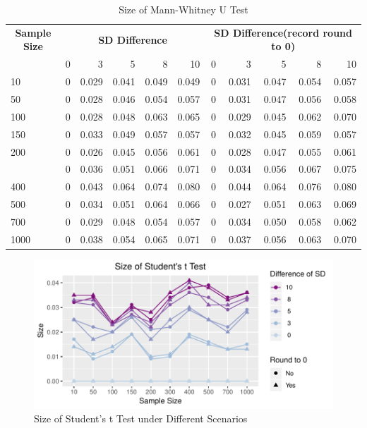 \documentclass[]{article}
\begin{document}
\begin{table}

\caption{\label{tab:size-tables}Size of Mann-Whitney U Test}
\centering
\begin{tabular}[t]{lrrrrrrrrrr}
\toprule
\multicolumn{1}{c}{\bfseries Sample Size} & \multicolumn{5}{c}{\bfseries SD Difference} & \multicolumn{5}{c}{\bfseries SD Difference(record round to 0)} \\
\cmidrule(l{2pt}r{2pt}){1-1} \cmidrule(l{2pt}r{2pt}){2-6} \cmidrule(l{2pt}r{2pt}){7-11}
  & 0 & 3 & 5 & 8 & 10 & 0 & 3 & 5 & 8 & 10\\
\midrule
10 & 0 & 0.029 & 0.041 & 0.049 & 0.049 & 0 & 0.031 & 0.047 & 0.054 & 0.057\\
50 & 0 & 0.028 & 0.046 & 0.054 & 0.057 & 0 & 0.031 & 0.047 & 0.056 & 0.058\\
100 & 0 & 0.028 & 0.048 & 0.063 & 0.065 & 0 & 0.029 & 0.045 & 0.062 & 0.070\\
150 & 0 & 0.033 & 0.049 & 0.057 & 0.057 & 0 & 0.032 & 0.045 & 0.059 & 0.057\\
200 & 0 & 0.026 & 0.045 & 0.056 & 0.061 & 0 & 0.028 & 0.047 & 0.055 & 0.061\\
\addlinespace
300 & 0 & 0.036 & 0.051 & 0.066 & 0.071 & 0 & 0.034 & 0.056 & 0.067 & 0.075\\
400 & 0 & 0.043 & 0.064 & 0.074 & 0.080 & 0 & 0.044 & 0.064 & 0.076 & 0.080\\
500 & 0 & 0.034 & 0.051 & 0.064 & 0.066 & 0 & 0.027 & 0.051 & 0.063 & 0.069\\
700 & 0 & 0.029 & 0.048 & 0.054 & 0.057 & 0 & 0.034 & 0.050 & 0.058 & 0.062\\
1000 & 0 & 0.038 & 0.054 & 0.065 & 0.071 & 0 & 0.037 & 0.056 & 0.063 & 0.070\\
\bottomrule
\end{tabular}
\end{table}

\begin{figure}
\centering
\includegraphics{../figure/size_t.pdf}
\caption{Size of Student's t Test under Different Scenarios}
\end{figure}
\end{document}
